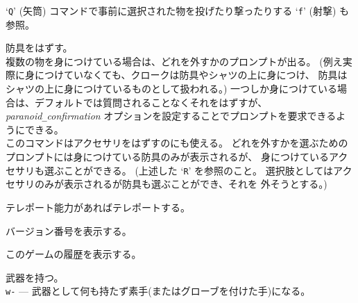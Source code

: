 `{\tt Q}' (矢筒) コマンドで事前に選択された物を投げたり撃ったりする
`{\tt f}' (射撃) も参照。
\item[\tb{T}]
防具をはずす。\\
複数の物を身につけている場合は、どれを外すかのプロンプトが出る。
(例え実際に身につけていなくても、クロークは防具やシャツの上に身につけ、
防具はシャツの上に身につけているものとして扱われる。)
一つしか身につけている場合は、デフォルトでは質問されることなくそれをはずすが、
{\it paranoid\verb+_+confirmation\/}
オプションを設定することでプロンプトを要求できるようにできる。\\
このコマンドはアクセサリをはずすのにも使える。
どれを外すかを選ぶためのプロンプトには身につけている防具のみが表示されるが、
身につけているアクセサリも選ぶことができる。
(上述した `{\tt R}' を参照のこと。
選択肢としてはアクセサリのみが表示されるが防具も選ぶことができ、それを
外そうとする。)
\item[\tb{\^{}T}]
テレポート能力があればテレポートする。
\item[\tb{v}]
バージョン番号を表示する。
\item[\tb{V}]
このゲームの履歴を表示する。
\item[\tb{w}]
武器を持つ。\\
{\tt w-} --- 武器として何も持たず素手(またはグローブを付けた手)になる。\\
